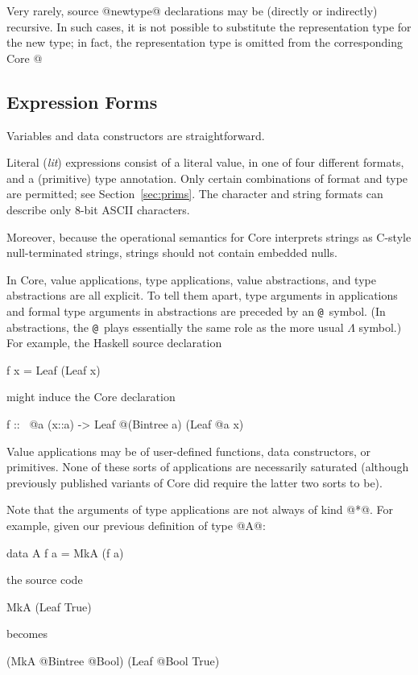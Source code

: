 \documentclass[10pt]{article}
\makeatletter
\newcommand{\at}{\texttt{@}}
\makeatother
\begin{document}
Very rarely, source @newtype@ declarations may be (directly or indirectly) recursive. In such
cases, it is not possible to substitute the representation type for the new type;
in fact, the representation type is omitted from the corresponding Core @%

\subsection{Expression Forms}
\label{sec:exprs}

Variables and data constructors are straightforward.

Literal ({\it lit}) expressions consist of a literal value, in one of four different formats,
and a (primitive) type annotation.   Only certain combinations of format and type
are permitted; see Section~\ref{sec:prims}.  The character and string formats can describe only
8-bit ASCII characters.  

Moreover, because the operational semantics for Core interprets strings as C-style null-terminated
strings, strings should not contain embedded nulls.

In Core, value applications, type applications, value abstractions, and type abstractions are all explicit. To tell them apart, type arguments in applications
and formal type arguments in abstractions are preceded by an \at\ symbol. (In abstractions,
the \at\ plays essentially the same role as the more usual $\Lambda$ symbol.)
For example, the Haskell source declaration
\begin{code}
f x = Leaf (Leaf x)
\end{code}
might induce the Core declaration
\begin{code}
f :: %
  \ @a (x::a) -> Leaf @(Bintree a) (Leaf @a x)
\end{code}

Value applications may be of user-defined functions, data constructors, or primitives.
None of these sorts of applications are necessarily saturated (although previously published variants
of Core did require the latter two sorts to be).

Note that the arguments of type applications are not always of kind @*@.  For example,
given our previous definition of type @A@:
\begin{code}
data A f a = MkA (f a)
\end{code}
the source code
\begin{code}
MkA (Leaf True)
\end{code}
becomes
\begin{code}
(MkA @Bintree @Bool) (Leaf @Bool True)
\end{code}
\end{document}
